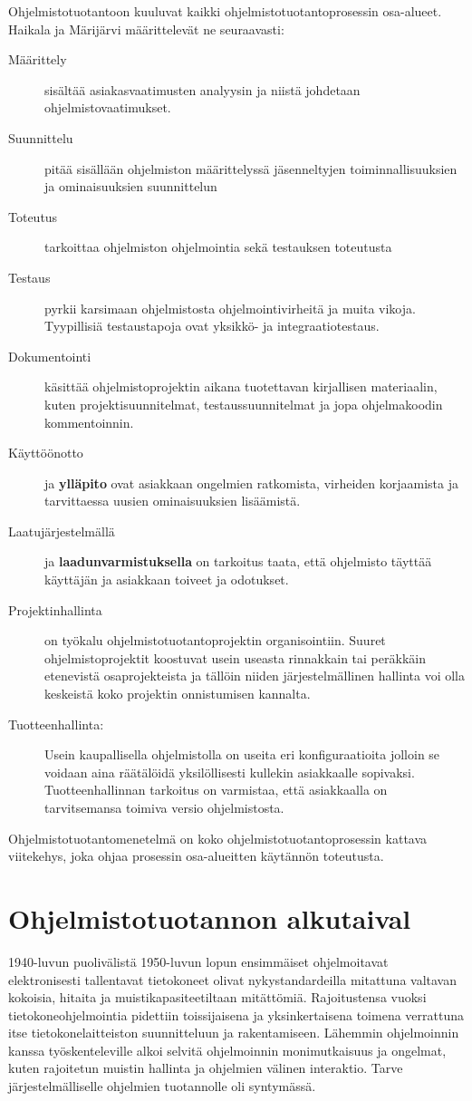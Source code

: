 \documentclass[finnish,12pt]{tktltiki2}
\theoremstyle{definition}
\theoremstyle{remark}
\begin{document}
Ohjelmistotuotantoon kuuluvat kaikki ohjelmistotuotantoprosessin osa-alueet. Haikala ja Märijärvi \cite{haikala2003ohjelmistotuotanto} määrittelevät ne seuraavasti:

\begin{description}
\item[Määrittely] sisältää asiakasvaatimusten analyysin ja niistä johdetaan ohjelmistovaatimukset.
\item[Suunnittelu] pitää sisällään ohjelmiston määrittelyssä jäsenneltyjen toiminnallisuuksien ja ominaisuuksien suunnittelun
\item[Toteutus] tarkoittaa ohjelmiston ohjelmointia sekä testauksen toteutusta
\item[Testaus] pyrkii karsimaan ohjelmistosta ohjelmointivirheitä ja muita vikoja. Tyypillisiä testaustapoja ovat yksikkö- ja integraatiotestaus.
\item[Dokumentointi] käsittää ohjelmistoprojektin aikana tuotettavan kirjallisen materiaalin, kuten projektisuunnitelmat, testaussuunnitelmat ja jopa ohjelmakoodin kommentoinnin.
\item[Käyttöönotto] ja \textbf{ylläpito} ovat asiakkaan ongelmien ratkomista, virheiden korjaamista ja tarvittaessa uusien ominaisuuksien lisäämistä.  
\item[Laatujärjestelmällä] ja \textbf{laadunvarmistuksella} on tarkoitus taata, että ohjelmisto täyttää käyttäjän ja asiakkaan toiveet ja odotukset.
\item[Projektinhallinta] on työkalu ohjelmistotuotantoprojektin organisointiin. Suuret ohjelmistoprojektit koostuvat usein useasta rinnakkain tai peräkkäin etenevistä osaprojekteista ja tällöin niiden järjestelmällinen hallinta voi olla keskeistä koko projektin onnistumisen kannalta. 
\item[Tuotteenhallinta:] Usein kaupallisella ohjelmistolla on useita eri konfiguraatioita jolloin se voidaan aina räätälöidä yksilöllisesti kullekin asiakkaalle sopivaksi. Tuotteenhallinnan tarkoitus on varmistaa, että asiakkaalla on tarvitsemansa toimiva versio ohjelmistosta.
\end{description}
Ohjelmistotuotantomenetelmä on koko ohjelmistotuotantoprosessin kattava viitekehys, joka ohjaa prosessin osa-alueitten käytännön toteutusta.

\section{Ohjelmistotuotannon alkutaival}
1940-luvun puolivälistä 1950-luvun lopun ensimmäiset ohjelmoitavat elektronisesti tallentavat tietokoneet olivat nykystandardeilla mitattuna valtavan kokoisia, hitaita ja muistikapasiteetiltaan mitättömiä. Rajoitustensa vuoksi tietokoneohjelmointia pidettiin toissijaisena ja yksinkertaisena toimena verrattuna itse tietokonelaitteiston suunnitteluun ja rakentamiseen. \cite{DBLP:reference/se/Grier10} Lähemmin ohjelmoinnin kanssa työskenteleville alkoi selvitä ohjelmoinnin monimutkaisuus ja ongelmat, kuten rajoitetun muistin hallinta ja ohjelmien välinen interaktio. Tarve järjestelmälliselle ohjelmien tuotannolle oli syntymässä.
\end{document}
